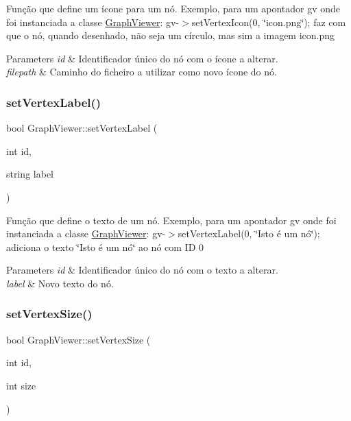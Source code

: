 Função que define um ícone para um nó. Exemplo, para um apontador gv onde foi instanciada a classe \mbox{\hyperlink{class_graph_viewer}{Graph\+Viewer}}\+: gv-\/$>$set\+Vertex\+Icon(0, \char`\"{}icon.\+png\char`\"{}); faz com que o nó, quando desenhado, não seja um círculo, mas sim a imagem icon.\+png


\begin{DoxyParams}{Parameters}
{\em id} & Identificador único do nó com o ícone a alterar. \\
\hline
{\em filepath} & Caminho do ficheiro a utilizar como novo ícone do nó. \\
\hline
\end{DoxyParams}
\mbox{\label{class_graph_viewer_ac25d7d007022fda16799808ba136e909}} 
\subsubsection{\texorpdfstring{setVertexLabel()}{setVertexLabel()}}
{\footnotesize\ttfamily bool Graph\+Viewer\+::set\+Vertex\+Label (\begin{DoxyParamCaption}\item[{int}]{id,  }\item[{string}]{label }\end{DoxyParamCaption})}

Função que define o texto de um nó. Exemplo, para um apontador gv onde foi instanciada a classe \mbox{\hyperlink{class_graph_viewer}{Graph\+Viewer}}\+: gv-\/$>$set\+Vertex\+Label(0, \char`\"{}\+Isto é um nó\char`\"{}); adiciona o texto \char`\"{}\+Isto é um nó\char`\"{} ao nó com ID 0


\begin{DoxyParams}{Parameters}
{\em id} & Identificador único do nó com o texto a alterar. \\
\hline
{\em label} & Novo texto do nó. \\
\hline
\end{DoxyParams}
\mbox{\label{class_graph_viewer_ae930dfdfcdeb7a871eefb6028d74b9f9}} 
\subsubsection{\texorpdfstring{setVertexSize()}{setVertexSize()}}
{\footnotesize\ttfamily bool Graph\+Viewer\+::set\+Vertex\+Size (\begin{DoxyParamCaption}\item[{int}]{id,  }\item[{int}]{size }\end{DoxyParamCaption})}

